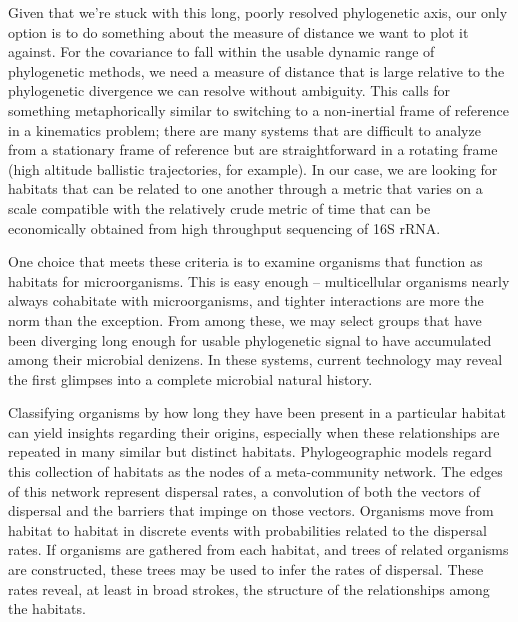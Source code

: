 Given that we're stuck with this long, poorly resolved phylogenetic axis, our only option is to do something about the measure of distance we want to plot it against. For the covariance to fall within the usable dynamic range of phylogenetic methods, we need a measure of distance that is large relative to the phylogenetic divergence we can resolve without ambiguity. This calls for something metaphorically similar to switching to a non-inertial frame of reference in a kinematics problem; there are many systems that are difficult to analyze from a stationary frame of reference but are straightforward in a rotating frame (high altitude ballistic trajectories, for example). In our case, we are looking for habitats that can be related to one another through a metric that varies on a scale compatible with the relatively crude metric of time that can be economically obtained from high throughput sequencing of 16S rRNA.

One choice that meets these criteria is to examine organisms that function as habitats for microorganisms. This is easy enough -- multicellular organisms nearly always cohabitate with microorganisms, and tighter interactions are more the norm than the exception. From among these, we may select groups that have been diverging long enough for usable phylogenetic signal to have accumulated among their microbial denizens. In these systems, current technology may reveal the first glimpses into a complete microbial natural history.

Classifying organisms by how long they have been present in a particular habitat can yield insights regarding their origins, especially when these relationships are repeated in many similar but distinct habitats. Phylogeographic models regard this collection of habitats as the nodes of a meta-community network. The edges of this network represent dispersal rates, a convolution of both the vectors of dispersal and the barriers that impinge on those vectors. Organisms move from habitat to habitat in discrete events with probabilities related to the dispersal rates. If organisms are gathered from each habitat, and trees of related organisms are constructed, these trees may be used to infer the rates of dispersal. These rates reveal, at least in broad strokes, the structure of the relationships among the habitats.

